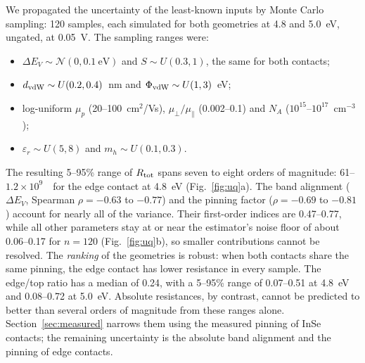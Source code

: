 We propagated the uncertainty of the least-known inputs by Monte Carlo sampling: 120 samples, each simulated for both geometries at 4.8 and 5.0~eV, ungated, at 0.05~V. The sampling ranges were:
\begin{itemize}
\item $\Delta E_V\sim\mathcal N(0,0.1~\mathrm{eV})$ and $S\sim U(0.3,1)$, the same for both contacts;
\item $d_{\rm vdW}\sim U(0.2,0.4)$~nm and $\Phi_{\rm vdW}\sim U(1,3)$~eV;
\item log-uniform $\mu_p$ (20--100~cm$^2$/Vs), $\mu_\perp/\mu_\parallel$ (0.002--0.1) and $N_A$ ($10^{15}$--$10^{17}$~cm$^{-3}$);
\item $\varepsilon_r\sim U(5,8)$ and $m_h\sim U(0.1,0.3)$.
\end{itemize}
The resulting 5--95\% range of $R_{\rm tot}$ spans seven to eight orders of magnitude: 61--$1.2\times10^9$~\ohmcm\ for the edge contact at 4.8~eV (Fig.~\ref{fig:uq}a). The band alignment ($\Delta E_V$, Spearman $\rho=-0.63$ to $-0.77$) and the pinning factor ($\rho=-0.69$ to $-0.81$) account for nearly all of the variance. Their first-order indices are 0.47--0.77, while all other parameters stay at or near the estimator's noise floor of about 0.06--0.17 for $n=120$ (Fig.~\ref{fig:uq}b), so smaller contributions cannot be resolved. The \emph{ranking} of the geometries is robust: when both contacts share the same pinning, the edge contact has lower resistance in every sample. The edge/top ratio has a median of 0.24, with a 5--95\% range of 0.07--0.51 at 4.8~eV and 0.08--0.72 at 5.0~eV. Absolute resistances, by contrast, cannot be predicted to better than several orders of magnitude from these ranges alone. Section~\ref{sec:measured} narrows them using the measured pinning of InSe contacts; the remaining uncertainty is the absolute band alignment and the pinning of edge contacts.


